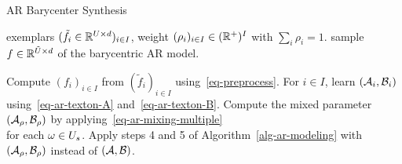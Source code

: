\begin{algorithm}[ht!]
\caption{AR Barycenter Synthesis}
\label{alg-ar-barycenter}
\Require exemplars $(\tilde f_i \in \mathbb{R}^{U \times d})_{i \in I}$, weight $(\rho_{i})_{i \in I} \in (\mathbb{R}^+)^{I}$ with $\sum_i \rho_i=1$.
\Ensure sample $f \in \mathbb{R}^{\tilde {U} \times d}$ of the barycentric AR model.
\begin{enumerate}
	 Compute $(f_i)_{i \in I}$ from $(\tilde f_i)_{i \in I}$
			using~\eqref{eq-preprocess}.
	 For $i \in I$, learn $(\mathcal{A}_i,\mathcal{B}_i)$ using~\eqref{eq-ar-texton-A} and~\eqref{eq-ar-texton-B}.
	 Compute the mixed parameter $(\mathcal{A}_\rho,\mathcal{B}_\rho)$ by applying~\eqref{eq-ar-mixing-multiple} \\ for each $\omega \in U_s$.
	 Apply steps 4 and 5 of Algorithm~\ref{alg-ar-modeling}
		with $(\mathcal{A}_\rho,\mathcal{B}_\rho)$ instead of $(\mathcal{A},\mathcal{B})$.
\end{enumerate}
\end{algorithm}




